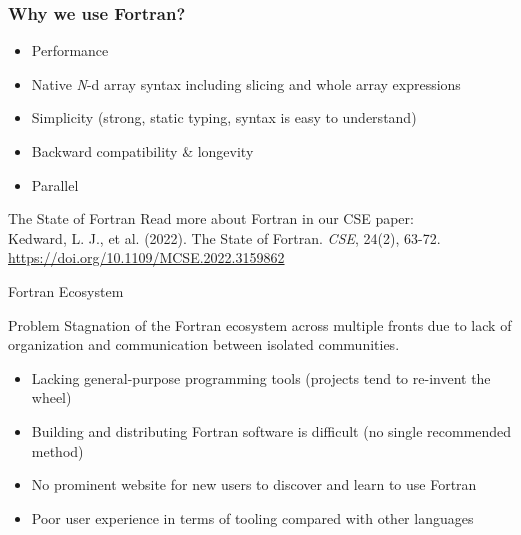 \documentclass[aspectratio=169]{beamer}
\begin{document}
\begin{frame}
\frametitle{Why we use Fortran?}

\begin{itemize}
    \item Performance
    \item Native \textit{N}-d array syntax including slicing and whole array expressions
    \item Simplicity (strong, static typing, syntax is easy to understand)
    \item Backward compatibility & longevity
    \item Parallel
\end{itemize}

{
\begin{block}{The State of Fortran}
    Read more about Fortran in our CSE paper:\\\vspace{2mm}Kedward, L. J., et al. (2022). The State of Fortran. \textit{CSE}, 24(2), 63-72. \url{https://doi.org/10.1109/MCSE.2022.3159862}
\end{block}}
\end{frame}

\begin{frame}{Fortran Ecosystem}
\begin{block}{Problem}
Stagnation of the Fortran ecosystem across multiple fronts due to lack of organization and communication between isolated communities.
\end{block}
\begin{itemize}
    \item Lacking general-purpose programming tools (projects tend to re-invent the wheel)
    \item Building and distributing Fortran software is difficult (no single recommended method)
    \item No prominent website for new users to discover and learn to use Fortran
    \item Poor user experience in terms of tooling compared with other languages
\end{itemize}
\end{frame}
\end{document}
